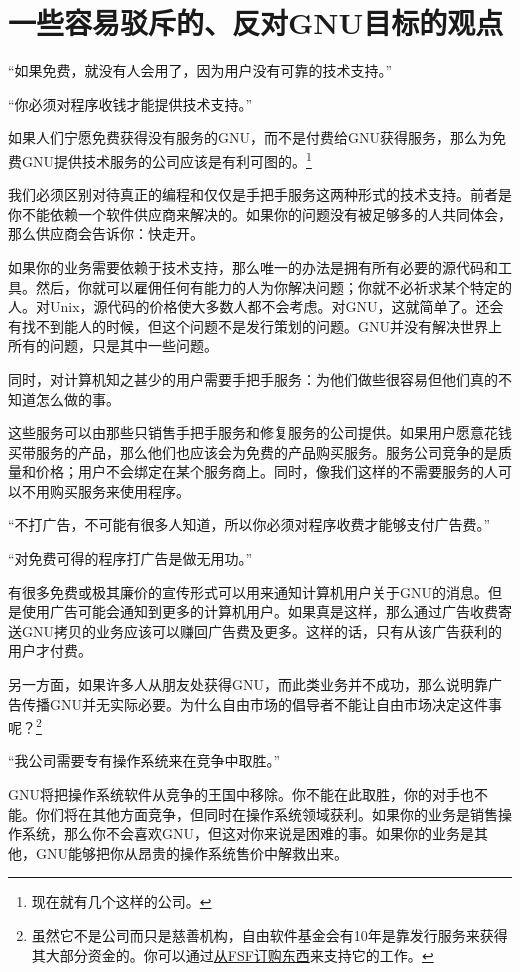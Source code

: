 \documentclass{book}
\begin{document}
\section{一些容易驳斥的、反对GNU目标的观点}
“如果免费，就没有人会用了，因为用户没有可靠的技术支持。”\par
“你必须对程序收钱才能提供技术支持。”\par
如果人们宁愿免费获得没有服务的GNU，而不是付费给GNU获得服务，那么为免费GNU提供技术服务的公司应该是有利可图的。\footnote{现在就有几个这样的公司。}\par
我们必须区别对待真正的编程和仅仅是手把手服务这两种形式的技术支持。前者是你不能依赖一个软件供应商来解决的。如果你的问题没有被足够多的人共同体会，那么供应商会告诉你：快走开。\par
如果你的业务需要依赖于技术支持，那么唯一的办法是拥有所有必要的源代码和工具。然后，你就可以雇佣任何有能力的人为你解决问题；你就不必祈求某个特定的人。对Unix，源代码的价格使大多数人都不会考虑。对GNU，这就简单了。还会有找不到能人的时候，但这个问题不是发行策划的问题。GNU并没有解决世界上所有的问题，只是其中一些问题。\par
同时，对计算机知之甚少的用户需要手把手服务：为他们做些很容易但他们真的不知道怎么做的事。\par
这些服务可以由那些只销售手把手服务和修复服务的公司提供。如果用户愿意花钱买带服务的产品，那么他们也应该会为免费的产品购买服务。服务公司竞争的是质量和价格；用户不会绑定在某个服务商上。同时，像我们这样的不需要服务的人可以不用购买服务来使用程序。\par
“不打广告，不可能有很多人知道，所以你必须对程序收费才能够支付广告费。”\par
“对免费可得的程序打广告是做无用功。”\par
有很多免费或极其廉价的宣传形式可以用来通知计算机用户关于GNU的消息。但是使用广告可能会通知到更多的计算机用户。如果真是这样，那么通过广告收费寄送GNU拷贝的业务应该可以赚回广告费及更多。这样的话，只有从该广告获利的用户才付费。\par
另一方面，如果许多人从朋友处获得GNU，而此类业务并不成功，那么说明靠广告传播GNU并无实际必要。为什么自由市场的倡导者不能让自由市场决定这件事呢？\footnote{虽然它不是公司而只是慈善机构，自由软件基金会有10年是靠发行服务来获得其大部分资金的。你可以通过\href{http://www.gnu.org/order/order.html}{从FSF订购东西}来支持它的工作。 }\par
“我公司需要专有操作系统来在竞争中取胜。”\par
GNU将把操作系统软件从竞争的王国中移除。你不能在此取胜，你的对手也不能。你们将在其他方面竞争，但同时在操作系统领域获利。如果你的业务是销售操作系统，那么你不会喜欢GNU，但这对你来说是困难的事。如果你的业务是其他，GNU能够把你从昂贵的操作系统售价中解救出来。\par
\end{document}
